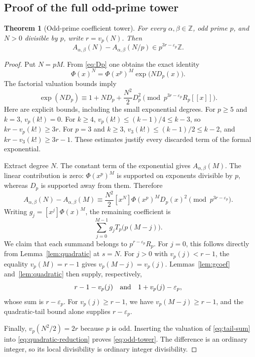 \documentclass[11pt,a4paper]{article}
\numberwithin{equation}{section}
\newtheorem{theorem}{Theorem}[section]
\theoremstyle{definition}
\theoremstyle{remark}
\newcommand{\Z}{\mathbb Z}
\newcommand{\eps}{\varepsilon}
\newcommand{\A}{A_{\alpha,\beta}}
\begin{document}
\subsection{Proof of the full odd-prime tower}
\begin{theorem}[Odd-prime coefficient tower]\label{thm:odd}
For every $\alpha,\beta\in\Z$, odd prime $p$, and $N>0$ divisible by $p$,
write $r=v_p(N)$. Then
\begin{equation}\label{eq:odd-tower}
 \A(N)-\A(N/p)\in p^{3r-\eps_p}\Z.
\end{equation}
\end{theorem}
\begin{proof}
Put $N=pM$. From \eqref{eq:Dp} one obtains the exact identity
\begin{equation}\label{eq:factor}
 \Phi(x)^N=\Phi(x^p)^M\exp\bigl(ND_p(x)\bigr).
\end{equation}
The factorial valuation bounds imply
\begin{equation}\label{eq:exp-trunc}
 \exp(ND_p)\equiv1+ND_p+\frac{N^2}{2}D_p^2
 \pmod{p^{3r-\eps_p}R_p[[x]]}.
\end{equation}
Here are explicit bounds, including the small exponential degrees. For
$p\ge5$ and $k=3$, $v_p(k!)=0$. For $k\ge4$,
$v_p(k!)\le(k-1)/4\le k-3$, so $kr-v_p(k!)\ge3r$.
For $p=3$ and $k\ge3$,
$v_3(k!)\le(k-1)/2\le k-2$, and $kr-v_3(k!)\ge3r-1$.
These estimates justify every discarded term of the formal exponential.

Extract degree $N$. The constant term of the exponential gives $\A(M)$.
The linear contribution is zero: $\Phi(x^p)^M$ is supported on exponents
divisible by $p$, whereas $D_p$ is supported away from them. Therefore
\begin{equation}\label{eq:quadratic-reduction}
 \A(N)-\A(M)\equiv
 \frac{N^2}{2}[x^N]\Phi(x^p)^M D_p(x)^2
 \pmod{p^{3r-\eps_p}}.
\end{equation}
Writing $g_j=[x^j]\Phi(x)^M$, the remaining coefficient is
\begin{equation}\label{eq:tail-sum}
 \sum_{j=0}^{M-1}g_j T_p\bigl(p(M-j)\bigr).
\end{equation}
We claim that each summand belongs to $p^{r-\eps_p}R_p$.
For $j=0$, this follows directly from Lemma~\ref{lem:quadratic} at $s=N$.
For $j>0$ with $v_p(j)<r-1$, the equality $v_p(M)=r-1$ gives
$v_p(M-j)=v_p(j)$. Lemmas~\ref{lem:gcoef} and~\ref{lem:quadratic} then
supply, respectively,
\[
 r-1-v_p(j)\quad\hbox{and}\quad 1+v_p(j)-\eps_p,
\]
whose sum is $r-\eps_p$.
For $v_p(j)\ge r-1$, we have $v_p(M-j)\ge r-1$, and the quadratic-tail
bound alone supplies $r-\eps_p$.

Finally, $v_p(N^2/2)=2r$ because $p$ is odd. Inserting the valuation of
\eqref{eq:tail-sum} into \eqref{eq:quadratic-reduction} proves
\eqref{eq:odd-tower}. The difference is an ordinary integer, so its local
divisibility is ordinary integer divisibility.
\end{proof}
\end{document}
